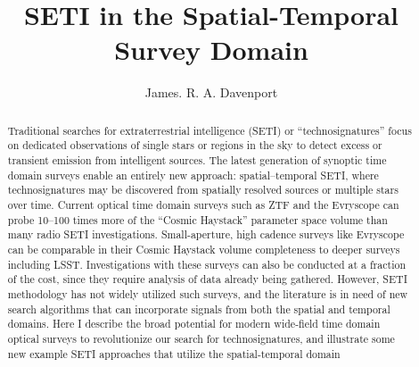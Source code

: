 \documentclass[twocolumn]{aastex62}
\begin{document}
\title{SETI in the Spatial-Temporal Survey Domain}



\author{James. R. A. Davenport}


\begin{abstract}
Traditional searches for extraterrestrial intelligence (SETI) or ``technosignatures'' focus on dedicated observations of single stars or regions in the sky to detect excess or transient emission from intelligent sources. The latest generation of synoptic time domain surveys  enable an entirely new approach: spatial--temporal SETI, where technosignatures may be discovered from spatially resolved sources or multiple stars over time. 
Current optical time domain surveys such as ZTF and the Evryscope can probe 10--100 times more of the ``Cosmic Haystack'' parameter space volume than many radio SETI investigations. Small-aperture, high cadence surveys like Evryscope can be comparable in their Cosmic Haystack volume completeness to deeper surveys including LSST. Investigations with these surveys can also be conducted at a fraction of the cost, since they require analysis of data already being gathered. 
However, SETI methodology has not widely utilized such surveys, and the literature is in need of new search algorithms that can incorporate signals from both the spatial and temporal domains.
Here I describe the broad potential for modern wide-field time domain optical surveys to revolutionize our search for technosignatures, and illustrate some new example SETI approaches that utilize the spatial-temporal domain
\end{abstract}

\end{document}
